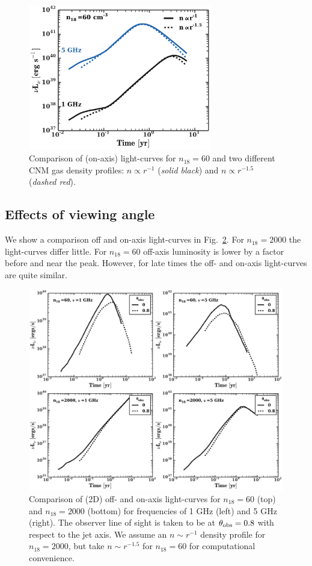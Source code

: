 \documentclass[usenatbib,fleqn]{mnras}
\begin{document}
\begin{figure} 
  \includegraphics[width=8cm]{profs2.pdf}
  \caption{\label{fig:profs2} Comparison of (on-axis) light-curves for
    $n_{18}=60$ and two different CNM gas density profiles: $n\propto
    r^{-1}$ ({\it solid black}) and $n\propto r^{-1.5}$ ({\it dashed
      red}).}
\end{figure}

\subsection{Effects of viewing angle}
We show a comparison off and on-axis light-curves in
Fig.~\ref{fig:onOff}.  For $n_{18}=2000$ the light-curves differ
little.  For $n_{18}=60$ off-axis luminosity is lower by a factor
before and near the peak. However, for late times
the off- and on-axis light-curves are quite similar.

\begin{figure}
\includegraphics[width=16cm]{on_off.pdf}
\caption{\label{fig:onOff} Comparison of (2D) off- and on-axis
  light-curves for $n_{18}=60$ (top) and $n_{18}=2000$ (bottom) for
  frequencies of 1 GHz (left) and 5 GHz (right). The observer line of
  sight is taken to be at $\theta_{\rm obs}=0.8$ with respect to the
  jet axis. We assume an $n\sim r^{-1}$ density profile for
  $n_{18}=2000$, but take $n\sim r^{-1.5}$ for $n_{18}=60$ for
  computational convenience.}
\end{figure}
\end{document}
